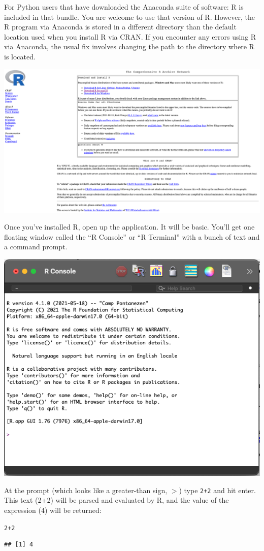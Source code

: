 \documentclass{article}\usepackage[]{graphicx}\usepackage[]{color}
\makeatletter
\newcommand{\hlnum}[1]{\textcolor[rgb]{0.686,0.059,0.569}{#1}}%
\newcommand{\hlopt}[1]{\textcolor[rgb]{0,0,0}{#1}}%
\newenvironment{kframe}{%
 \def\at@end@of@kframe{}%
 \ifinner\ifhmode%
  \def\at@end@of@kframe{\end{minipage}}%
  \begin{minipage}{\columnwidth}%
 \fi\fi%
 \def\FrameCommand##1{\hskip\@totalleftmargin \hskip-\fboxsep
 \colorbox{shadecolor}{##1}\hskip-\fboxsep
     \hskip-\linewidth \hskip-\@totalleftmargin \hskip\columnwidth}%
 \MakeFramed {\advance\hsize-\width
   \@totalleftmargin\z@ \linewidth\hsize
   \@setminipage}}%
 {\par\unskip\endMakeFramed%
 \at@end@of@kframe}
\newenvironment{knitrout}{}{} %
\makeatother
\begin{document}
For Python users that have downloaded the Anaconda suite of software: R is included in that bundle. You are welcome to use that version of R. However, the R program via Anaconda is stored in a different directory than the default location used when you install R via CRAN. If you encounter any errors using R via Anaconda, the usual fix involves changing the path to the directory where R is located.

\begin{center}
  \includegraphics[width=0.8\linewidth,keepaspectratio]{cran.png}
\end{center}

Once you've installed R, open up the application. It will be basic. You'll get one floating window called the ``R Console'' or ``R Terminal'' with a bunch of text and a command prompt.

\begin{center}
  \includegraphics[width=0.5\linewidth,keepaspectratio]{r_console.png}
\end{center}

At the prompt (which looks like a greater-than sign, $>$) type \texttt{2+2} and hit enter. This text (2+2) will be parsed and evaluated by R, and the value of the expression (4) will be returned:

\begin{knitrout}
\color{fgcolor}\begin{kframe}
\begin{alltt}
\hlnum{2}\hlopt{+}\hlnum{2}
\end{alltt}
\begin{verbatim}
## [1] 4
\end{verbatim}
\end{kframe}
\end{knitrout}
\end{document}
